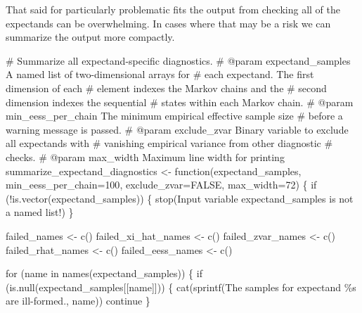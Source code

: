 \documentclass[
  letterpaper,
  DIV=11,
  numbers=noendperiod]{scrartcl}
\newenvironment{Shaded}{\begin{snugshade}}{\end{snugshade}}
\newcommand{\CommentTok}[1]{\textcolor[rgb]{0.37,0.37,0.37}{#1}}
\newcommand{\ControlFlowTok}[1]{\textcolor[rgb]{0.00,0.23,0.31}{#1}}
\newcommand{\DecValTok}[1]{\textcolor[rgb]{0.68,0.00,0.00}{#1}}
\newcommand{\KeywordTok}[1]{\textcolor[rgb]{0.00,0.23,0.31}{#1}}
\newcommand{\NormalTok}[1]{\textcolor[rgb]{0.00,0.23,0.31}{#1}}
\newcommand{\OperatorTok}[1]{\textcolor[rgb]{0.37,0.37,0.37}{#1}}
\newcommand{\SpecialCharTok}[1]{\textcolor[rgb]{0.37,0.37,0.37}{#1}}
\newcommand{\StringTok}[1]{\textcolor[rgb]{0.13,0.47,0.30}{#1}}
\begin{document}
That said for particularly problematic fits the output from checking all
of the expectands can be overwhelming. In cases where that may be a risk
we can summarize the output more compactly.

\begin{Shaded}
\begin{Highlighting}[]
\CommentTok{\# Summarize all expectand{-}specific diagnostics.}
\CommentTok{\# @param expectand\_samples A named list of two{-}dimensional arrays for}
\CommentTok{\#                          each expectand.  The first dimension of each}
\CommentTok{\#                          element indexes the Markov chains and the }
\CommentTok{\#                          second dimension indexes the sequential }
\CommentTok{\#                          states within each Markov chain.}
\CommentTok{\# @param min\_eess\_per\_chain The minimum empirical effective sample size}
\CommentTok{\#                           before a warning message is passed.}
\CommentTok{\# @param exclude\_zvar Binary variable to exclude all expectands with}
\CommentTok{\#                     vanishing empirical variance from other diagnostic}
\CommentTok{\#                     checks.}
\CommentTok{\# @param max\_width Maximum line width for printing}
\NormalTok{summarize\_expectand\_diagnostics }\OperatorTok{\textless{}{-}}\NormalTok{ function(expectand\_samples,}
\NormalTok{                                            min\_eess\_per\_chain}\OperatorTok{=}\DecValTok{100}\NormalTok{,}
\NormalTok{                                            exclude\_zvar}\OperatorTok{=}\NormalTok{FALSE,}
\NormalTok{                                            max\_width}\OperatorTok{=}\DecValTok{72}\NormalTok{) \{}
  \ControlFlowTok{if}\NormalTok{ (}\OperatorTok{!}\KeywordTok{is}\NormalTok{.vector(expectand\_samples)) \{}
\NormalTok{    stop(}\StringTok{\textquotesingle{}Input variable \textasciigrave{}expectand\_samples\textasciigrave{} is not a named list!\textquotesingle{}}\NormalTok{)}
\NormalTok{  \}}

\NormalTok{  failed\_names }\OperatorTok{\textless{}{-}}\NormalTok{ c()}
\NormalTok{  failed\_xi\_hat\_names }\OperatorTok{\textless{}{-}}\NormalTok{ c()}
\NormalTok{  failed\_zvar\_names }\OperatorTok{\textless{}{-}}\NormalTok{ c()}
\NormalTok{  failed\_rhat\_names }\OperatorTok{\textless{}{-}}\NormalTok{ c()}
\NormalTok{  failed\_eess\_names }\OperatorTok{\textless{}{-}}\NormalTok{ c()}

  \ControlFlowTok{for}\NormalTok{ (name }\KeywordTok{in}\NormalTok{ names(expectand\_samples)) \{}
    \ControlFlowTok{if}\NormalTok{ (}\KeywordTok{is}\NormalTok{.null(expectand\_samples[[name]])) \{}
\NormalTok{      cat(sprintf(}\StringTok{\textquotesingle{}The samples for expectand \textasciigrave{}}\SpecialCharTok{\%s}\StringTok{\textasciigrave{} are ill{-}formed.\textquotesingle{}}\NormalTok{, name))}
      \ControlFlowTok{continue}
\NormalTok{    \}}
    

\end{Highlighting}
\end{Shaded}
\end{document}

